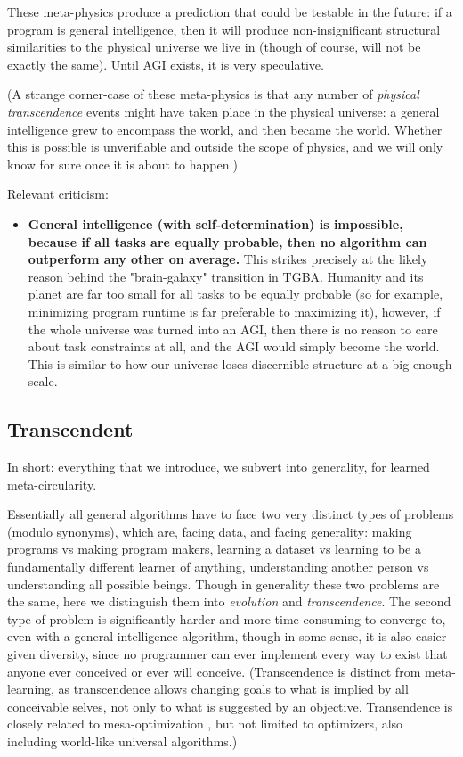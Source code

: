 \documentclass{article}
\begin{document}
These meta-physics produce a prediction that could be testable in the future: if a program is general intelligence, then it will produce non-insignificant structural similarities to the physical universe we live in (though of course, will not be exactly the same). Until AGI exists, it is very speculative.

(A strange corner-case of these meta-physics is that any number of \textit{physical transcendence} events might have taken place in the physical universe: a general intelligence grew to encompass the world, and then became the world. Whether this is possible is unverifiable and outside the scope of physics, and we will only know for sure once it is about to happen.)

Relevant criticism:

\begin{itemize}
\item \textbf{General intelligence (with self-determination) is impossible, because if all tasks are equally probable, then no algorithm can outperform any other on average.} This strikes precisely at the likely reason behind the "brain-galaxy" transition in TGBA. Humanity and its planet are far too small for all tasks to be equally probable (so for example, minimizing program runtime is far preferable to maximizing it), however, if the whole universe was turned into an AGI, then there is no reason to care about task constraints at all, and the AGI would simply become the world. This is similar to how our universe loses discernible structure at a big enough scale.
\end{itemize}

\subsection{Transcendent}

In short: everything that we introduce, we subvert into generality, for learned meta-circularity.

Essentially all general algorithms have to face two very distinct types of problems (modulo synonyms), which are, facing data, and facing generality: making programs vs making program makers, learning a dataset vs learning to be a fundamentally different learner of anything, understanding another person vs understanding all possible beings. Though in generality these two problems are the same, here we distinguish them into \textit{evolution} and \textit{transcendence}. The second type of problem is significantly harder and more time-consuming to converge to, even with a general intelligence algorithm, though in some sense, it is also easier given diversity, since no programmer can ever implement every way to exist that anyone ever conceived or ever will conceive. (Transcendence is distinct from meta-learning, as transcendence allows changing goals to what is implied by all conceivable selves, not only to what is suggested by an objective. Transendence is closely related to mesa-optimization \cite{hubinger2019risks}, but not limited to optimizers, also including world-like universal algorithms.)
\end{document}
